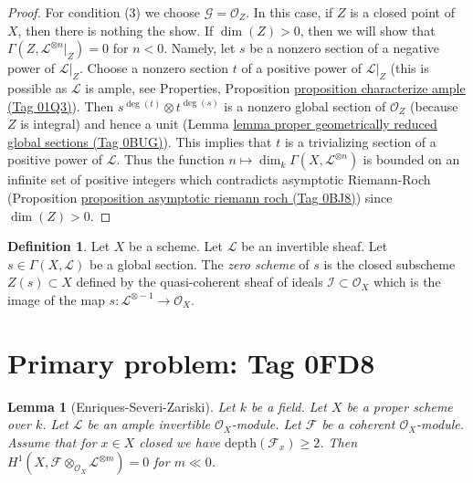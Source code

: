 \documentclass{amsart}
\theoremstyle{plain}
\newtheorem{lemma}[subsection]{Lemma}
\theoremstyle{definition}
\newtheorem{definition}[subsection]{Definition}
\theoremstyle{remark}
\numberwithin{equation}{subsection}
\begin{document}
\begin{proof}
\medskip\noindent
For condition (3) we choose $\mathcal{G} = \mathcal{O}_Z$.
In this case, if $Z$ is a closed point of $X$, then there is
nothing the show. If $\dim(Z) > 0$, then we will show that
$\Gamma(Z, \mathcal{L}^{\otimes n}|_Z) = 0$
for $n < 0$. Namely, let $s$ be a nonzero section of a negative
power of $\mathcal{L}|_Z$. Choose a nonzero section $t$ of a positive
power of $\mathcal{L}|_Z$ (this is possible as $\mathcal{L}$ is ample, see
Properties, Proposition \href{https://stacks.math.columbia.edu/tag/01Q3}{proposition characterize ample (Tag 01Q3)}).
Then $s^{\deg(t)} \otimes t^{\deg(s)}$
is a nonzero global section of $\mathcal{O}_Z$
(because $Z$ is integral) and hence
a unit (Lemma \href{https://stacks.math.columbia.edu/tag/0BUG}{lemma proper geometrically reduced global sections (Tag 0BUG)}).
This implies that $t$ is a trivializing section
of a positive power of $\mathcal{L}$.
Thus the function $n \mapsto \dim_k \Gamma(X, \mathcal{L}^{\otimes n})$
is bounded on an infinite set of positive integers which contradicts
asymptotic Riemann-Roch
(Proposition \href{https://stacks.math.columbia.edu/tag/0BJ8}{proposition asymptotic riemann roch (Tag 0BJ8)})
since $\dim(Z) > 0$.
\end{proof}


\begin{definition}
\label{divisors-definition-zero-scheme-s}
Let $X$ be a scheme. Let $\mathcal{L}$ be an invertible sheaf.
Let $s \in \Gamma(X, \mathcal{L})$ be a global section.
The {\it zero scheme} of $s$ is the closed subscheme $Z(s) \subset X$
defined by the quasi-coherent sheaf of ideals
$\mathcal{I} \subset \mathcal{O}_X$ which is the image of the
map $s : \mathcal{L}^{\otimes -1} \to \mathcal{O}_X$.
\end{definition}

\section*{Primary problem: Tag 0FD8}
\begin{lemma}[Enriques-Severi-Zariski]
\label{lemma-vanishin-h1-negative}
Let $k$ be a field. Let $X$ be a proper scheme over $k$. Let $\mathcal{L}$
be an ample invertible $\mathcal{O}_X$-module. Let $\mathcal{F}$ be a
coherent $\mathcal{O}_X$-module. Assume that
for $x \in X$ closed we have $\text{depth}(\mathcal{F}_x) \geq 2$.
Then
$H^1(X, \mathcal{F} \otimes_{\mathcal{O}_X} \mathcal{L}^{\otimes m}) = 0$
for $m \ll 0$.
\end{lemma}
\end{document}

